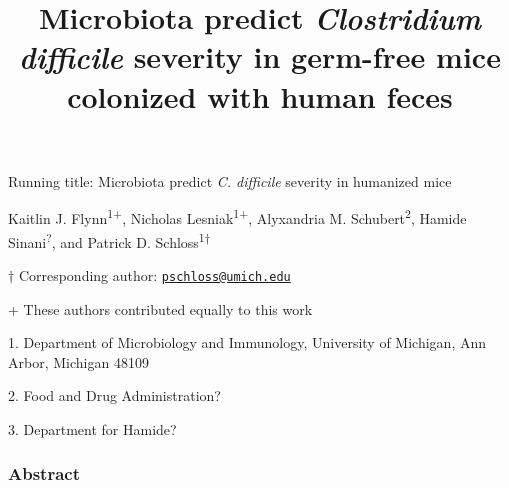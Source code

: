 \documentclass[11pt,]{article}
\title{\textbf{Microbiota predict \emph{Clostridium difficile} severity in
germ-free mice colonized with human feces}}
\author{}
\date{}
\begin{document}
\maketitle


\vspace{35mm}

Running title: Microbiota predict \emph{C. difficile} severity in
humanized mice

\vspace{35mm}

Kaitlin J. Flynn\textsuperscript{1+}, Nicholas
Lesniak\textsuperscript{1+}, Alyxandria M. Schubert\textsuperscript{2},
Hamide Sinani\textsuperscript{?}, and Patrick D.
Schloss\textsuperscript{1\(\dagger\)}

\vspace{35mm}

\(\dagger\) Corresponding author:
\href{mailto:pschloss@umich.edu}{\nolinkurl{pschloss@umich.edu}}

+ These authors contributed equally to this work

1. Department of Microbiology and Immunology, University of Michigan,
Ann Arbor, Michigan 48109

2. Food and Drug Administration?

3. Department for Hamide?

\newpage
\linenumbers

\subsubsection{Abstract}\label{abstract}
\end{document}
